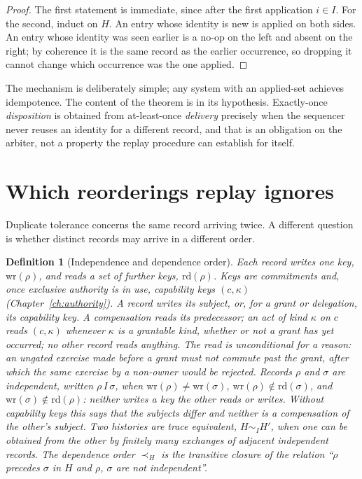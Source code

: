 \documentclass[11pt,openany]{book}
\newtheorem{definition}[theorem]{Definition}
\theoremstyle{remark}
\begin{document}
\begin{proof}
The first statement is immediate, since after the first application $i\in
I$. For the second, induct on $H$. An entry whose identity is new is
applied on both sides. An entry whose identity was seen earlier is a no-op
on the left and absent on the right; by coherence it is the same record
as the earlier occurrence, so dropping it cannot change which occurrence
was the one applied.
\end{proof}

The mechanism is deliberately simple; any system with an applied-set
achieves idempotence. The content of the theorem is in its hypothesis.
Exactly-once \emph{disposition} is obtained from at-least-once
\emph{delivery} precisely when the sequencer never reuses an identity for a
different record, and that is an obligation on the arbiter, not a property
the replay procedure can establish for itself.

\section{Which reorderings replay ignores}

Duplicate tolerance concerns the same record arriving twice. A different
question is whether distinct records may arrive in a different order.

\begin{definition}[Independence and dependence order]
\label{def:dependence}
Each record \emph{writes} one key, $\mathrm{wr}(\rho)$, and \emph{reads}
a set of further keys, $\mathrm{rd}(\rho)$. Keys are commitments and, once
exclusive authority is in use, capability keys $(c,\kappa)$
(Chapter~\ref{ch:authority}). A record writes its subject, or, for a grant
or delegation, its capability key. A compensation reads its predecessor;
an act of kind $\kappa$ on $c$ reads $(c,\kappa)$ whenever $\kappa$ is a
grantable kind, whether or not a grant has yet occurred; no other record
reads anything. The read is unconditional for a reason: an ungated
exercise made before a grant must not commute past the grant, after which
the same exercise by a non-owner would be rejected. Records $\rho$ and $\sigma$ are
\emph{independent}, written $\rho\,I\,\sigma$, when
$\mathrm{wr}(\rho)\ne\mathrm{wr}(\sigma)$, $\mathrm{wr}(\rho)\notin
\mathrm{rd}(\sigma)$, and $\mathrm{wr}(\sigma)\notin\mathrm{rd}(\rho)$:
neither writes a key the other reads or writes. Without capability keys
this says that the subjects differ and neither is a compensation of the
other's subject. Two histories are \emph{trace
equivalent}, $H\sim_I H'$, when one can be obtained from the other by
finitely many exchanges of adjacent independent records. The
\emph{dependence order} $\prec_H$ is the transitive closure of the relation
``$\rho$ precedes $\sigma$ in $H$ and $\rho$, $\sigma$ are not
independent''.
\end{definition}
\end{document}
